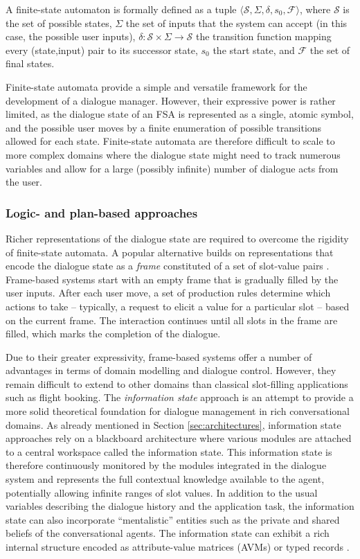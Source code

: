 A finite-state automaton is formally defined as a tuple $\langle \mathcal{S}, \Sigma, \delta, s_0, \mathcal{F} \rangle$, where $\mathcal{S}$ is the set of possible states, $\Sigma$ the set of inputs that the system can accept (in this case, the possible user inputs),  $\delta: \mathcal{S} \times \Sigma \rightarrow \mathcal{S}$ the transition function mapping every (state,input) pair to its successor state, $s_0$ the start state, and $\mathcal{F}$ the set of final states. 

Finite-state automata provide a simple and versatile framework for the development of a dialogue manager. However, their expressive power is rather limited, as the dialogue state of an FSA is represented as a single, atomic symbol, and the possible user moves by a finite enumeration of possible transitions allowed for each state.  Finite-state automata are therefore difficult to scale to more complex domains where the dialogue state might need to track numerous variables and allow for a large (possibly infinite) number of dialogue acts from the user.  

\subsubsection*{Logic- and plan-based approaches}

Richer representations of the dialogue state are required to overcome the rigidity of finite-state automata. A popular alternative builds on representations that encode the dialogue state as a \textit{frame} constituted of a set of slot-value pairs \citep{seneff2000}.  Frame-based systems start with an empty frame that is gradually filled by the user inputs.  After each user move, a set of production rules determine which actions to take  -- typically, a request to elicit a value for a particular slot -- based on the current frame.  The interaction continues until all slots in the frame are filled, which marks the completion of the dialogue. 

Due to their greater expressivity, frame-based systems offer a number of advantages in terms of domain modelling and dialogue control.  However, they remain difficult to extend to other domains than classical slot-filling applications such as flight booking.  The \textit{information state} approach \citep{Larsson:2000} is an attempt to provide a more solid theoretical foundation for dialogue management in rich conversational domains.  As already mentioned in Section \ref{sec:architectures}, information state approaches rely on a blackboard architecture where various modules are attached to a central workspace called the information state. This information state is therefore continuously monitored by the modules integrated in the dialogue system and represents the full contextual knowledge available to the agent, potentially allowing infinite ranges of slot values. In addition to the usual variables describing the dialogue history and the application task, the information state can also incorporate ``mentalistic'' entities such as the private and shared beliefs of the conversational agents.  The information state can exhibit a rich internal structure encoded as attribute-value matrices (AVMs) or typed records  \citep{RobinCooper2012}. 

